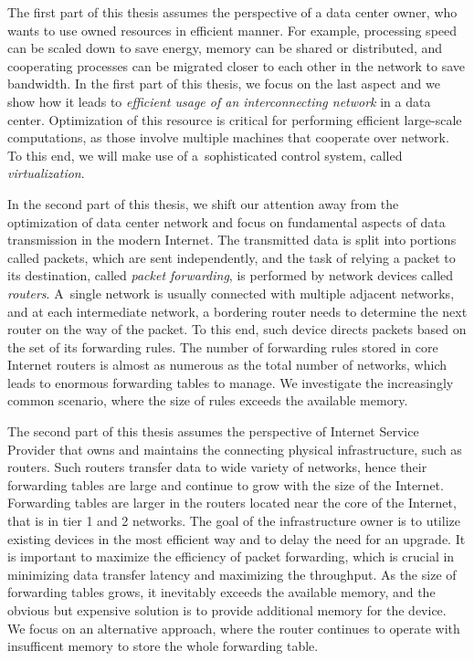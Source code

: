 \medskip
The first part of this thesis assumes the perspective of a data center owner, who wants to use owned resources in efficient manner.
For example, processing speed can be scaled down to save energy, memory can be shared or distributed, and cooperating processes can be migrated closer to each other in the network to save bandwidth.
In the first part of this thesis, we focus on the last aspect and we show how it leads to
\emph{efficient usage of an interconnecting network} in a data center.
Optimization of this resource is critical for performing efficient large-scale computations, as those involve multiple machines that cooperate over network.
To this end, we will make use of a~sophisticated control system, called \emph{virtualization}.

\medskip

In the second part of this thesis, we shift our attention away from the optimization of data center network and focus on fundamental aspects of data transmission in the modern Internet.
The transmitted data is split into portions called packets, which are sent independently, and the task of relying a packet to its destination, called \emph{packet forwarding}, is performed by network devices called \emph{routers}.
A~single network is usually connected with multiple adjacent networks, and at each intermediate network, a bordering router needs to determine the next router on the way of the packet.
To this end, such device directs packets based on the set of its forwarding rules.
The number of forwarding rules stored in core Internet routers is almost as numerous as the total number of networks, which leads to enormous forwarding tables to manage.
We investigate the increasingly common scenario, where the size of rules exceeds the available memory.

The second part of this thesis assumes the perspective of Internet Service Provider that owns and maintains the connecting physical infrastructure, such as routers.
Such routers transfer data to wide variety of networks, hence their forwarding tables are large and continue to grow with the size of the Internet.
Forwarding tables are larger in the routers located near the core of the Internet, that is in tier 1 and 2 networks.
The goal of the infrastructure owner is to utilize existing devices in the most efficient way and to delay the need for an upgrade.
It is important to maximize the efficiency of packet forwarding, which is crucial in minimizing data transfer latency and maximizing the throughput.
As the size of forwarding tables grows, it inevitably exceeds the available memory, and the obvious but expensive solution is to provide additional memory for the device.
We focus on an alternative approach, where the router continues to operate with insufficent memory to store the whole forwarding table.



